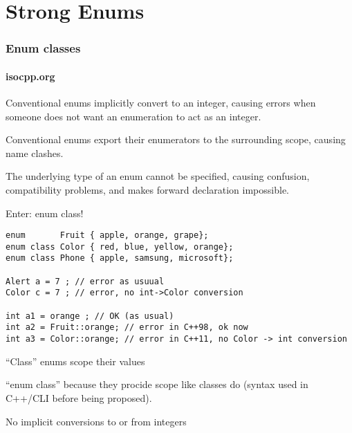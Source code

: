 \section{Strong Enums}

\begin{frame}[fragile]
\frametitle{Enum classes}
\framesubtitle{isocpp.org}
\begin{itemize}
{\scriptsize
\item Conventional enums implicitly convert to an integer, causing errors when someone does not want an enumeration to act as an integer.
\pause{}
\item Conventional enums export their enumerators to the surrounding scope, causing name clashes.
\pause{}
\item The underlying type of an enum cannot be specified, causing confusion, compatibility problems, and makes forward declaration impossible.
\pause{}
\item Enter: enum class!
\begin{verbatim}
enum       Fruit { apple, orange, grape};
enum class Color { red, blue, yellow, orange};
enum class Phone { apple, samsung, microsoft};

Alert a = 7 ; // error as usuual
Color c = 7 ; // error, no int->Color conversion

int a1 = orange ; // OK (as usual)
int a2 = Fruit::orange; // error in C++98, ok now
int a3 = Color::orange; // error in C++11, no Color -> int conversion

\end{verbatim}

\item ``Class'' enums scope their values
\item ``enum class'' because they procide scope like classes do
  (syntax used in C++/CLI before being proposed).
\item No implicit conversions to or from integers
}

\end{itemize}
\end{frame}


